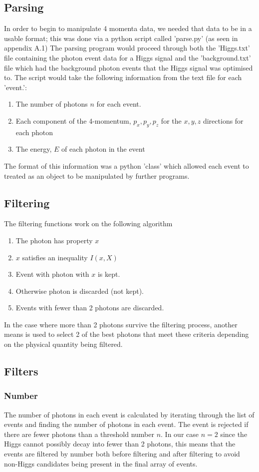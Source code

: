 \documentclass{article}
\begin{document}
\subsection{Parsing}
In order to begin to manipulate 4 momenta data, we needed that data to be in a usable format; this was done via a python script called 'parse.py' (as seen in appendix A.1) The parsing program would proceed through both the 'Higgs.txt' file containing the photon event data for a Higgs signal and the 'background.txt' file which had the background photon events that the Higgs signal was optimised to. The script would take the following information from the text file for each 'event.':
\begin{enumerate}
\item The number of photons $n$ for each event.
\item Each component of the 4-momentum, $p_x, p_y, p_z$ for the $x, y, z$ directions for each photon
\item The energy, $E$ of each photon in the event
\end{enumerate}
The format of this information was a python 'class' which allowed each event to treated as an object to be manipulated by further programs.
\subsection{Filtering}
The filtering functions work on the following algorithm
\begin{enumerate}
\item The photon has property $x$
\item $x$ satisfies an inequality $I(x, X)$
\item Event with photon with $x$ is kept.
\item Otherwise photon is discarded (not kept).
\item Events with fewer than 2 photons are discarded.
\end{enumerate}
In the case where more than 2 photons survive the filtering process, another means is used to select 2 of the best photons that meet these criteria depending on the physical quantity being filtered.
\subsection{Filters}
\subsubsection{Number}
The number of photons in each event is calculated by iterating through the list of events and finding the number of photons in each event. The event is rejected if there are fewer photons than a threshold number $n$. In our case $n=2$ since the Higgs cannot possibly decay into fewer than 2 photons, this means that the events are filtered by number both before filtering and after filtering to avoid non-Higgs candidates being present in the final array of events. 
\end{document}
